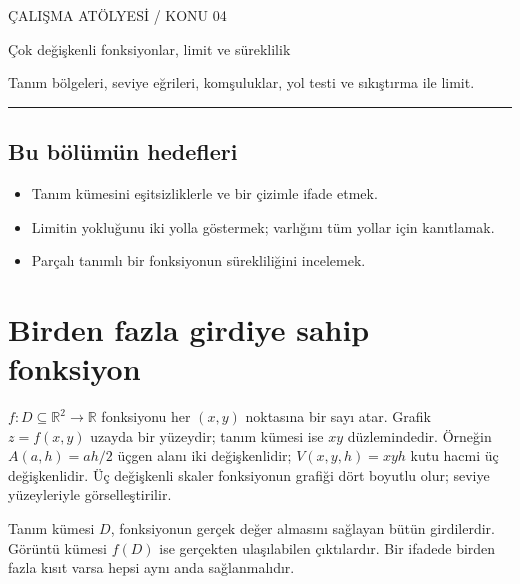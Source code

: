 
{\sffamily\small\color{accent} ÇALIŞMA ATÖLYESİ / KONU 04\par}
\vspace{8mm}
{\Huge\sffamily\bfseries\raggedright{} Çok değişkenli fonksiyonlar, limit ve süreklilik\par}
\vspace{3mm}
{\large Tanım bölgeleri, seviye eğrileri, komşuluklar, yol testi ve sıkıştırma ile limit.\par}
\vspace{4mm}\hrule\vspace{4mm}\subsection*{Bu bölümün hedefleri}\begin{itemize}
\item Tanım kümesini eşitsizliklerle ve bir çizimle ifade etmek.
\item Limitin yokluğunu iki yolla göstermek; varlığını tüm yollar için kanıtlamak.
\item Parçalı tanımlı bir fonksiyonun sürekliliğini incelemek.\end{itemize}
{\small\tableofcontents}\clearpage
\section{Birden fazla girdiye sahip fonksiyon}
\(f:D\subseteq\mathbb R^2\to\mathbb R\) fonksiyonu her \((x,y)\) noktasına bir sayı atar. Grafik \(z=f(x,y)\) uzayda bir yüzeydir; tanım kümesi ise \(xy\) düzlemindedir. Örneğin \(A(a,h)=ah/2\) üçgen alanı iki değişkenlidir; \(V(x,y,h)=xyh\) kutu hacmi üç değişkenlidir. Üç değişkenli skaler fonksiyonun grafiği dört boyutlu olur; seviye yüzeyleriyle görselleştirilir.

Tanım kümesi \(D\), fonksiyonun gerçek değer almasını sağlayan bütün girdilerdir. Görüntü kümesi \(f(D)\) ise gerçekten ulaşılabilen çıktılardır. Bir ifadede birden fazla kısıt varsa hepsi aynı anda sağlanmalıdır.

